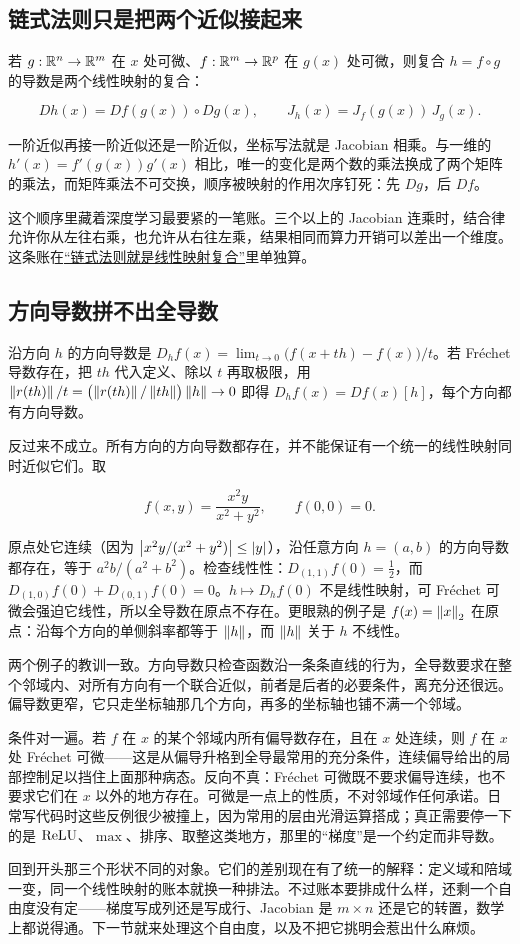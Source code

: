 \subsection{链式法则只是把两个近似接起来}

若 \(g:\mathbb{R}^n\to\mathbb{R}^m\) 在 \(x\) 处可微、\(f:\mathbb{R}^m\to\mathbb{R}^p\) 在 \(g(x)\) 处可微，则复合 \(h=f\circ g\) 的导数是两个线性映射的复合：

\[
Dh(x)=Df(g(x))\circ Dg(x),
\qquad
J_h(x)=J_f(g(x))\,J_g(x).
\]

一阶近似再接一阶近似还是一阶近似，坐标写法就是 Jacobian 相乘。与一维的 \(h'(x)=f'(g(x))g'(x)\) 相比，唯一的变化是两个数的乘法换成了两个矩阵的乘法，而矩阵乘法不可交换，顺序被映射的作用次序钉死：先 \(Dg\)，后 \(Df\)。

这个顺序里藏着深度学习最要紧的一笔账。三个以上的 Jacobian 连乘时，结合律允许你从左往右乘，也允许从右往左乘，结果相同而算力开销可以差出一个维度。这条账在\hyperref[sec:10-Matrix-Calculus/02-Differentials/02]{``链式法则就是线性映射复合''}里单独算。

\subsection{方向导数拼不出全导数}

沿方向 \(h\) 的方向导数是 \(D_hf(x)=\lim_{t\to 0}\bigl(f(x+th)-f(x)\bigr)/t\)。若 Fréchet 导数存在，把 \(th\) 代入定义、除以 \(t\) 再取极限，用 \(\left\lVert r(th)\right\rVert/t=\bigl(\left\lVert r(th)\right\rVert/\left\lVert th\right\rVert\bigr)\left\lVert h\right\rVert\to 0\) 即得 \(D_hf(x)=Df(x)[h]\)，每个方向都有方向导数。

反过来不成立。所有方向的方向导数都存在，并不能保证有一个统一的线性映射同时近似它们。取

\[
f(x,y)=\frac{x^2y}{x^2+y^2},\qquad f(0,0)=0.
\]

原点处它连续（因为 \(\left|x^2y/(x^2+y^2)\right|\le\left|y\right|\)），沿任意方向 \(h=(a,b)\) 的方向导数都存在，等于 \(a^2b/(a^2+b^2)\)。检查线性性：\(D_{(1,1)}f(0)=\tfrac12\)，而 \(D_{(1,0)}f(0)+D_{(0,1)}f(0)=0\)。\(h\mapsto D_hf(0)\) 不是线性映射，可 Fréchet 可微会强迫它线性，所以全导数在原点不存在。更眼熟的例子是 \(f(x)=\left\lVert x\right\rVert_2\) 在原点：沿每个方向的单侧斜率都等于 \(\left\lVert h\right\rVert\)，而 \(\left\lVert h\right\rVert\) 关于 \(h\) 不线性。

两个例子的教训一致。方向导数只检查函数沿一条条直线的行为，全导数要求在整个邻域内、对所有方向有一个联合近似，前者是后者的必要条件，离充分还很远。偏导数更窄，它只走坐标轴那几个方向，再多的坐标轴也铺不满一个邻域。

条件对一遍。若 \(f\) 在 \(x\) 的某个邻域内所有偏导数存在，且在 \(x\) 处连续，则 \(f\) 在 \(x\) 处 Fréchet 可微——这是从偏导升格到全导最常用的充分条件，连续偏导给出的局部控制足以挡住上面那种病态。反向不真：Fréchet 可微既不要求偏导连续，也不要求它们在 \(x\) 以外的地方存在。可微是一点上的性质，不对邻域作任何承诺。日常写代码时这些反例很少被撞上，因为常用的层由光滑运算搭成；真正需要停一下的是 \(\operatorname{ReLU}\)、\(\max\)、排序、取整这类地方，那里的``梯度''是一个约定而非导数。

回到开头那三个形状不同的对象。它们的差别现在有了统一的解释：定义域和陪域一变，同一个线性映射的账本就换一种排法。不过账本要排成什么样，还剩一个自由度没有定——梯度写成列还是写成行、Jacobian 是 \(m\times n\) 还是它的转置，数学上都说得通。下一节就来处理这个自由度，以及不把它挑明会惹出什么麻烦。
